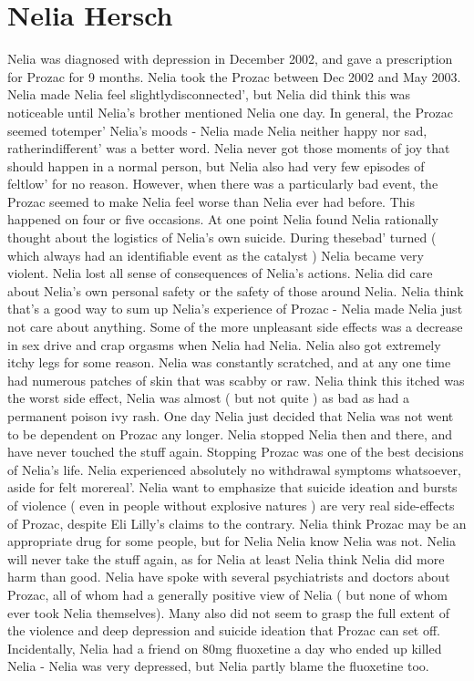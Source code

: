 \documentclass[12pt]{book}
\begin{document}
\chapter{Nelia Hersch}

Nelia was diagnosed with depression in December 2002, and gave a prescription for Prozac for 9 months. Nelia took the Prozac between Dec 2002 and May 2003. Nelia made Nelia feel slightlydisconnected', but Nelia did think this was noticeable until Nelia's brother mentioned Nelia one day. In general, the Prozac seemed totemper' Nelia's moods - Nelia made Nelia neither happy nor sad, ratherindifferent' was a better word. Nelia never got those moments of joy that should happen in a normal person, but Nelia also had very few episodes of feltlow' for no reason. However, when there was a particularly bad event, the Prozac seemed to make Nelia feel worse than Nelia ever had before. This happened on four or five occasions. At one point Nelia found Nelia rationally thought about the logistics of Nelia's own suicide. During thesebad' turned ( which always had an identifiable event as the catalyst ) Nelia became very violent. Nelia lost all sense of consequences of Nelia's actions. Nelia did care about Nelia's own personal safety or the safety of those around Nelia. Nelia think that's a good way to sum up Nelia's experience of Prozac - Nelia made Nelia just not care about anything. Some of the more unpleasant side effects was a decrease in sex drive and crap orgasms when Nelia had Nelia. Nelia also got extremely itchy legs for some reason. Nelia was constantly scratched, and at any one time had numerous patches of skin that was scabby or raw. Nelia think this itched was the worst side effect, Nelia was almost ( but not quite ) as bad as had a permanent poison ivy rash. One day Nelia just decided that Nelia was not went to be dependent on Prozac any longer. Nelia stopped Nelia then and there, and have never touched the stuff again. Stopping Prozac was one of the best decisions of Nelia's life. Nelia experienced absolutely no withdrawal symptoms whatsoever, aside for felt morereal'. Nelia want to emphasize that suicide ideation and bursts of violence ( even in people without explosive natures ) are very real side-effects of Prozac, despite Eli Lilly's claims to the contrary. Nelia think Prozac may be an appropriate drug for some people, but for Nelia Nelia know Nelia was not. Nelia will never take the stuff again, as for Nelia at least Nelia think Nelia did more harm than good. Nelia have spoke with several psychiatrists and doctors about Prozac, all of whom had a generally positive view of Nelia ( but none of whom ever took Nelia themselves). Many also did not seem to grasp the full extent of the violence and deep depression and suicide ideation that Prozac can set off. Incidentally, Nelia had a friend on 80mg fluoxetine a day who ended up killed Nelia - Nelia was very depressed, but Nelia partly blame the fluoxetine too.
\end{document}
